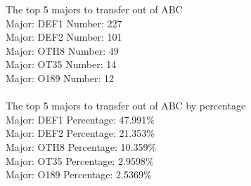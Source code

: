 
The top 5 majors to transfer out of ABC\\
Major: DEF1 	Number: 227\\
Major: DEF2 	Number: 101\\
Major: OTH8 	Number: 49\\
Major: OT35 	Number: 14\\
Major: O189 	Number: 12\\
\\
The top 5 majors to transfer out of ABC by percentage\\
Major: DEF1 	Percentage: 47.991\%\\
Major: DEF2 	Percentage: 21.353\%\\
Major: OTH8 	Percentage: 10.359\%\\
Major: OT35 	Percentage: 2.9598\%\\
Major: O189 	Percentage: 2.5369\%\\